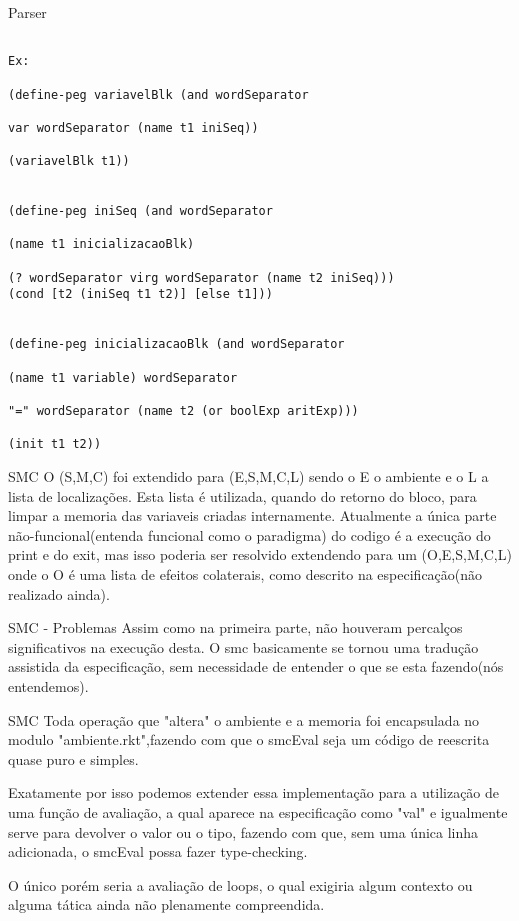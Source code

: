\documentclass{beamer}
\begin{document}
\begin{frame}{Parser}
\begin{verbatim}

Ex:

(define-peg variavelBlk (and wordSeparator 

var wordSeparator (name t1 iniSeq)) 

(variavelBlk t1))


(define-peg iniSeq (and wordSeparator 

(name t1 inicializacaoBlk) 

(? wordSeparator virg wordSeparator (name t2 iniSeq))) 
(cond [t2 (iniSeq t1 t2)] [else t1]))


(define-peg inicializacaoBlk (and wordSeparator 

(name t1 variable) wordSeparator 

"=" wordSeparator (name t2 (or boolExp aritExp))) 

(init t1 t2))

\end{verbatim}

\end{frame}

\begin{frame}{SMC}
O (S,M,C) foi extendido para (E,S,M,C,L) sendo o E o ambiente e o L a lista de localizações. Esta lista é utilizada, quando do retorno do bloco, para limpar a memoria das
variaveis criadas internamente. Atualmente a única parte não-funcional(entenda funcional como o paradigma) do codigo é a execução do print e do exit, mas isso poderia ser
resolvido extendendo para um (O,E,S,M,C,L) onde o O é uma lista de efeitos colaterais, como descrito na especificação(não realizado ainda).
\end{frame}

\begin{frame}{SMC - Problemas}
Assim como na primeira parte, não houveram percalços significativos na execução desta. O smc basicamente se tornou uma tradução assistida da especificação, sem necessidade
de entender o que se esta fazendo(nós entendemos).
\end{frame}

\begin{frame}{SMC}
Toda operação que "altera" o ambiente e a memoria foi encapsulada no modulo "ambiente.rkt",fazendo com que o smcEval seja um código de reescrita quase puro e simples.

Exatamente por isso podemos extender essa implementação para a utilização de uma função de avaliação, a qual aparece na especificação como "val" e igualmente serve para devolver o valor ou o tipo, fazendo com que, sem uma única linha adicionada, o smcEval possa fazer type-checking. 

O único porém seria a avaliação de loops, o qual exigiria algum contexto ou alguma tática ainda não plenamente compreendida.
\end{frame}
\end{document}
